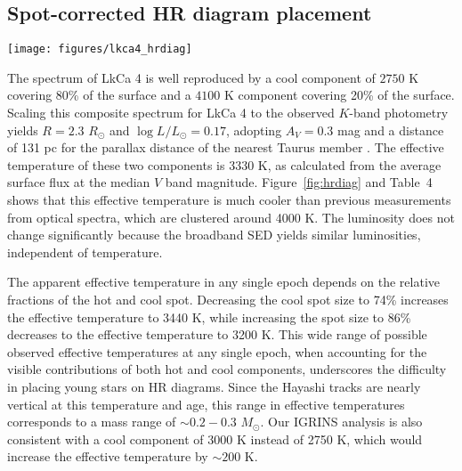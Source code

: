 \documentclass[twocolumn]{emulateapj}%
\begin{document}
\subsection{Spot-corrected HR diagram placement}

\begin{figure*}
 \centering
 \texttt{[image: figures/lkca4\_hrdiag]}
 \caption{Locations for LkCa 4 on an HR diagram, compared with models of pre-main sequence evolution calculated by \citet{baraffe15} with isochrones (black lines) and evolution models of a single mass (dashed blue lines) as marked.  The measured effective temperature and luminosity from this paper, based on the two-component fit and a median $V$-band magnitude, corresponds to the black asterisk.  The yellow shaded region corresponds to the range of apparent effective temperatures that are would be measured as the hot component rotates into and out of our view.  The blue circle corresponds to the measurement at blue-optical wavelengths by \citet{donati14}, the purple square corresponds to the measurement from low-resolution optical spectra, biased to TiO band strengths, by \citet[][biased to]{herczeg14}, while the red diamond corresponds to what we would measure from the K-band spectrum and 2MASS $J$-band magnitude.}
 \label{fig:hrdiag}
\end{figure*}

The spectrum of LkCa 4 is well reproduced by a cool component of $2750$ K covering 80\% of the surface and a $4100$ K component covering 20\% of the surface.   Scaling this composite spectrum for LkCa 4 to the observed $K$-band photometry yields $R=2.3$ $R_\odot$ and $\log L/L_\odot=0.17$, adopting $A_V=0.3$ mag and a distance of 131 pc for the parallax distance of the nearest Taurus member \citep{torres12}.  The effective temperature of these two components is 3330 K, as calculated from the average surface flux at the median $V$ band magnitude.  Figure~\ref{fig:hrdiag} and Table~4 shows that this effective temperature is much cooler than previous measurements from optical spectra, which are clustered around 4000 K.  The luminosity does not change significantly because the broadband SED yields similar luminosities, independent of temperature.

The apparent effective temperature in any single epoch depends on the relative fractions of the hot and cool spot.  Decreasing the cool spot size to 74\% increases the effective temperature to 3440 K, while increasing the spot size to 86\% decreases to the effective temperature to 3200 K.  This wide range of possible observed effective temperatures at any single epoch, when accounting for the visible contributions of both hot and cool components, underscores the difficulty in placing young stars on HR diagrams.  
Since the Hayashi tracks are nearly vertical at this temperature and age, this range in effective temperatures corresponds to a mass range of $\sim 0.2-0.3$ $M_\odot$.  Our IGRINS analysis is also consistent with a cool component of 3000 K instead of 2750 K, which would increase the effective temperature by $\sim 200$ K.  
\end{document}
